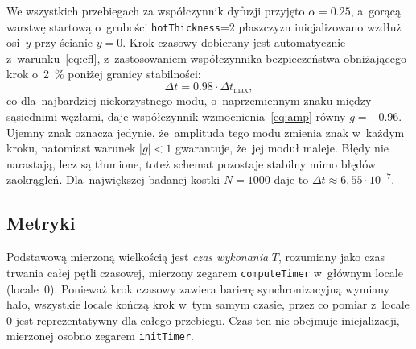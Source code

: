 We wszystkich przebiegach za współczynnik
dyfuzji przyjęto $\alpha=\num{0.25}$, a~gorącą warstwę startową o~grubości
\texttt{hotThickness}=\num{2} płaszczyzn inicjalizowano wzdłuż osi~$y$ przy ścianie $y=0$.
Krok czasowy dobierany jest automatycznie z~warunku~\eqref{eq:cfl}, z~zastosowaniem
współczynnika bezpieczeństwa obniżającego krok o~\SI{2}{\percent} poniżej granicy stabilności:
\begin{equation}
  \Delta t = \num{0.98}\cdot\Delta t_{\max},
  \label{eq:dt}
\end{equation}
co dla~najbardziej niekorzystnego modu, o~naprzemiennym znaku między sąsiednimi
węzłami, daje współczynnik wzmocnienia~\eqref{eq:amp} równy $g=\num{-0.96}$. Ujemny
znak oznacza jedynie, że~amplituda tego modu zmienia znak w~każdym kroku, natomiast
warunek $\lvert g\rvert<1$ gwarantuje, że~jej moduł maleje. Błędy nie narastają,
lecz są tłumione, toteż schemat pozostaje stabilny mimo błędów zaokrągleń.
Dla~największej badanej kostki $N=1000$ daje to $\Delta t\approx 6{,}55\cdot 10^{-7}$.

\subsection{Metryki}

Podstawową mierzoną wielkością jest \emph{czas wykonania} $T$, rozumiany jako czas trwania
całej pętli czasowej, mierzony zegarem \texttt{computeTimer} w~głównym locale (locale~0).
Ponieważ krok czasowy zawiera barierę synchronizacyjną wymiany halo, wszystkie locale kończą
krok w~tym samym czasie, przez co pomiar z~locale 0 jest reprezentatywny dla całego
przebiegu. Czas ten nie obejmuje inicjalizacji, mierzonej osobno zegarem
\texttt{initTimer}.

